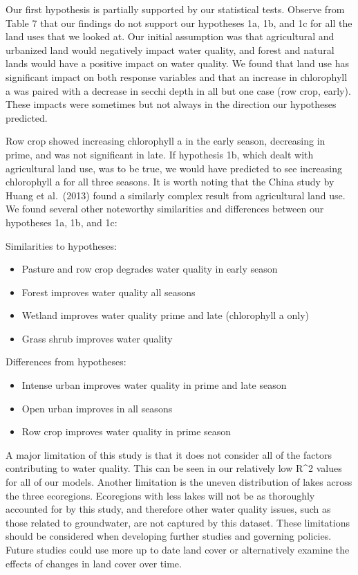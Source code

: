 \documentclass[12pt,]{article}
\providecommand{\tightlist}{%
  \setlength{\itemsep}{0pt}\setlength{\parskip}{0pt}}
\begin{document}
Our first hypothesis is partially supported by our statistical tests.
Observe from Table 7 that our findings do not support our hypotheses 1a,
1b, and 1c for all the land uses that we looked at. Our initial
assumption was that agricultural and urbanized land would negatively
impact water quality, and forest and natural lands would have a positive
impact on water quality. We found that land use has significant impact
on both response variables and that an increase in chlorophyll a was
paired with a decrease in secchi depth in all but one case (row crop,
early). These impacts were sometimes but not always in the direction our
hypotheses predicted.

Row crop showed increasing chlorophyll a in the early season, decreasing
in prime, and was not significant in late. If hypothesis 1b, which dealt
with agricultural land use, was to be true, we would have predicted to
see increasing chlorophyll a for all three seasons. It is worth noting
that the China study by Huang et al.~(2013) found a similarly complex
result from agricultural land use. We found several other noteworthy
similarities and differences between our hypotheses 1a, 1b, and 1c:

Similarities to hypotheses:

\begin{itemize}
\tightlist
\item
  Pasture and row crop degrades water quality in early season
\item
  Forest improves water quality all seasons
\item
  Wetland improves water quality prime and late (chlorophyll a only)
\item
  Grass shrub improves water quality
\end{itemize}

Differences from hypotheses:

\begin{itemize}
\tightlist
\item
  Intense urban improves water quality in prime and late season
\item
  Open urban improves in all seasons
\item
  Row crop improves water quality in prime season
\end{itemize}

A major limitation of this study is that it does not consider all of the
factors contributing to water quality. This can be seen in our
relatively low R\^{}2 values for all of our models. Another limitation
is the uneven distribution of lakes across the three ecoregions.
Ecoregions with less lakes will not be as thoroughly accounted for by
this study, and therefore other water quality issues, such as those
related to groundwater, are not captured by this dataset. These
limitations should be considered when developing further studies and
governing policies. Future studies could use more up to date land cover
or alternatively examine the effects of changes in land cover over time.
\end{document}
